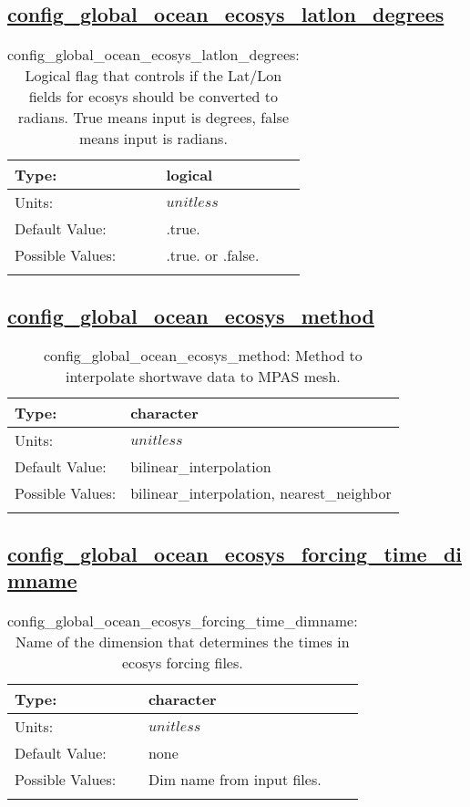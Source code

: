 \subsection[config\_global\_ocean\_ecosys\_latlon\_degrees]{\hyperref[sec:nm_tab_global_ocean]{config\_global\_ocean\_ecosys\_latlon\_degrees}}
\label{subsec:nm_sec_config_global_ocean_ecosys_latlon_degrees}
\begin{center}
\begin{longtable}{| p{2.0in} || p{4.0in} |}
    \hline
    Type: & logical \\
    \hline
    Units: & $unitless$ \\
    \hline
    Default Value: & .true. \\
    \hline
    Possible Values: & .true. or .false. \\
    \hline
    \caption{config\_global\_ocean\_ecosys\_latlon\_degrees: Logical flag that controls if the Lat/Lon fields for ecosys should be converted to radians. True means input is degrees, false means input is radians.}
\end{longtable}
\end{center}
\subsection[config\_global\_ocean\_ecosys\_method]{\hyperref[sec:nm_tab_global_ocean]{config\_global\_ocean\_ecosys\_method}}
\label{subsec:nm_sec_config_global_ocean_ecosys_method}
\begin{center}
\begin{longtable}{| p{2.0in} || p{4.0in} |}
    \hline
    Type: & character \\
    \hline
    Units: & $unitless$ \\
    \hline
    Default Value: & bilinear\_interpolation \\
    \hline
    Possible Values: & bilinear\_interpolation, nearest\_neighbor \\
    \hline
    \caption{config\_global\_ocean\_ecosys\_method: Method to interpolate shortwave data to MPAS mesh.}
\end{longtable}
\end{center}
\subsection[config\_global\_ocean\_ecosys\_forcing\_time\_dimname]{\hyperref[sec:nm_tab_global_ocean]{config\_global\_ocean\_ecosys\_forcing\_time\_dimname}}
\label{subsec:nm_sec_config_global_ocean_ecosys_forcing_time_dimname}
\begin{center}
\begin{longtable}{| p{2.0in} || p{4.0in} |}
    \hline
    Type: & character \\
    \hline
    Units: & $unitless$ \\
    \hline
    Default Value: & none \\
    \hline
    Possible Values: & Dim name from input files. \\
    \hline
    \caption{config\_global\_ocean\_ecosys\_forcing\_time\_dimname: Name of the dimension that determines the times in ecosys forcing files.}
\end{longtable}
\end{center}
